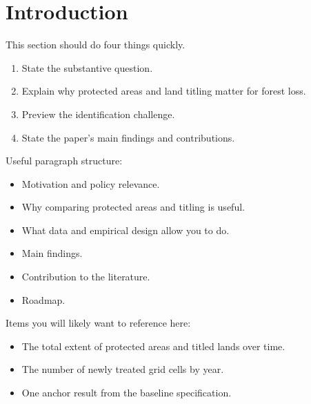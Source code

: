 \section{Introduction}

This section should do four things quickly.

\begin{enumerate}
    \item State the substantive question.
    \item Explain why protected areas and land titling matter for forest loss.
    \item Preview the identification challenge.
    \item State the paper's main findings and contributions.
\end{enumerate}

Useful paragraph structure:

\begin{itemize}
    \item Motivation and policy relevance.
    \item Why comparing protected areas and titling is useful.
    \item What data and empirical design allow you to do.
    \item Main findings.
    \item Contribution to the literature.
    \item Roadmap.
\end{itemize}

Items you will likely want to reference here:

\begin{itemize}
    \item The total extent of protected areas and titled lands over time.
    \item The number of newly treated grid cells by year.
    \item One anchor result from the baseline specification.
\end{itemize}
